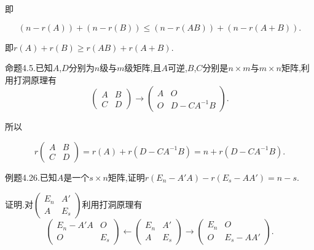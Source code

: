 \documentclass{article}
\begin{document}
即

\begin{equation*}
    \left(n - r \left(A\right)\right) + \left(n - r \left(B\right)\right) \le \left(n - r \left(AB\right)\right) + \left(n - r \left(A + B\right)\right).
\end{equation*}

即$r \left(A\right) + r \left(B\right) \ge r \left(AB\right) + r \left(A + B\right)$.

\vspace{1ex}

\vspace{1ex}
{\heiti 命题4.5.}{\kaishu 已知$A$,$D$分别为$n$级与$m$级矩阵,且$A$可逆,$B$,$C$分别是$n\times m$与$m\times n$矩阵,利用打洞原理有}
\begin{equation*}
    \left(
    \begin{array}{cc}
        A & B \\
        C & D
    \end{array}
    \right)
    \longrightarrow
    \left(
    \begin{array}{cc}
        A & O          \\
        O & D-CA^{-1}B
    \end{array}
    \right).
\end{equation*}

所以

\begin{equation*}
    r
    \left(
    \begin{array}{cc}
            A & B \\
            C & D
        \end{array}
    \right)
    =
    r \left(A\right) + r \left(D - CA^{-1}B\right)
    =
    n + r \left(D - CA^{-1}B\right).
\end{equation*}

{\heiti 例题4.26.}{\kaishu 已知$A$是一个$s\times n$矩阵,证明$r \left(E_n - A'A\right)-r \left(E_s - AA'\right) = n - s$.}

\vspace{1ex}
{\heiti 证明.}对$\left(\begin{array}{cc}
            E_n & A'  \\
            A   & E_s
        \end{array}\right)$利用打洞原理有
\begin{equation*}
    \left(
    \begin{array}{cc}
        E_n - A'A & O   \\
        O         & E_s
    \end{array}
    \right)
    \longleftarrow
    \left(
    \begin{array}{cc}
        E_n & A'  \\
        A   & E_s
    \end{array}
    \right)
    \longrightarrow
    \left(
    \begin{array}{cc}
        E_n & O         \\
        O   & E_s - AA'
    \end{array}
    \right).
\end{equation*}
\end{document}
